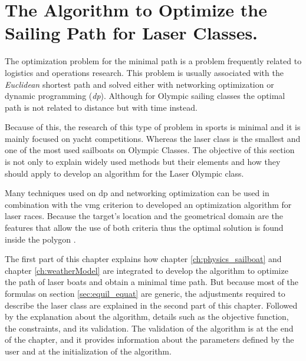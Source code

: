 \chapter{The Algorithm to Optimize the Sailing Path for Laser Classes.} \label{sec:AlgOptSail}
The optimization problem for the minimal path is a problem frequently related to logistics and operations research. This problem is usually associated with the \textit{Euclidean} shortest path and solved either with networking optimization or dynamic programming (\textit{\acrshort{dp}}). Although for Olympic sailing classes the optimal path is not related to distance but with time instead. \par \noindent 
Because of this, the research of this type of problem in sports is minimal and it is mainly focused on yacht competitions. Whereas the laser class is the smallest and one of the most used sailboats on Olympic Classes. The objective of this section is not only to explain widely used methods but their elements and how they should apply to develop an algorithm for the Laser Olympic class.\par

Many techniques used on \acrshort{dp} and networking optimization can be used in combination with the \acrshort{vmg} criterion to developed an optimization algorithm for laser races.  Because the target's location and the geometrical domain are the features that allow the use of both criteria thus the optimal solution is found inside the polygon \cite{mitchell2000geometric}.\par 

The first part of this chapter explains how chapter \ref{ch:physics_sailboat} and chapter \ref{ch:weatherModel} are integrated to develop the algorithm to optimize the path of laser boats and obtain a minimal time path. But because most of the formulas on section \ref{sec:equil_equat} are generic, the adjustments required to describe the laser class are explained in the second part of this chapter. Followed by the explanation about the algorithm, details such as the objective function, the constraints, and its validation. The validation of the algorithm is at the end of the chapter, and it provides information about the parameters defined by the user and at the initialization of the algorithm. \par 

